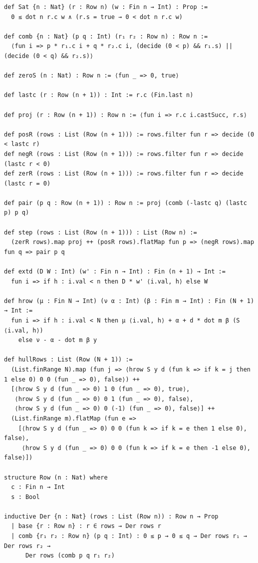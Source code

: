 \label{lean:constr-farkas}
\begin{lstlisting}
def Sat {n : Nat} (r : Row n) (w : Fin n → Int) : Prop :=
  0 ≤ dot n r.c w ∧ (r.s = true → 0 < dot n r.c w)

def comb {n : Nat} (p q : Int) (r₁ r₂ : Row n) : Row n :=
  ⟨fun i => p * r₁.c i + q * r₂.c i, (decide (0 < p) && r₁.s) || (decide (0 < q) && r₂.s)⟩

def zeroS (n : Nat) : Row n := ⟨fun _ => 0, true⟩

def lastc (r : Row (n + 1)) : Int := r.c (Fin.last n)

def proj (r : Row (n + 1)) : Row n := ⟨fun i => r.c i.castSucc, r.s⟩

def posR (rows : List (Row (n + 1))) := rows.filter fun r => decide (0 < lastc r)
def negR (rows : List (Row (n + 1))) := rows.filter fun r => decide (lastc r < 0)
def zerR (rows : List (Row (n + 1))) := rows.filter fun r => decide (lastc r = 0)

def pair (p q : Row (n + 1)) : Row n := proj (comb (-lastc q) (lastc p) p q)

def step (rows : List (Row (n + 1))) : List (Row n) :=
  (zerR rows).map proj ++ (posR rows).flatMap fun p => (negR rows).map fun q => pair p q

def extd (D W : Int) (w' : Fin n → Int) : Fin (n + 1) → Int :=
  fun i => if h : i.val < n then D * w' ⟨i.val, h⟩ else W

def hrow (μ : Fin N → Int) (ν α : Int) (β : Fin m → Int) : Fin (N + 1) → Int :=
  fun i => if h : i.val < N then μ ⟨i.val, h⟩ + α + d * dot m β (S ⟨i.val, h⟩)
    else ν - α - dot m β y

def hullRows : List (Row (N + 1)) :=
  (List.finRange N).map (fun j => ⟨hrow S y d (fun k => if k = j then 1 else 0) 0 0 (fun _ => 0), false⟩) ++
  [⟨hrow S y d (fun _ => 0) 1 0 (fun _ => 0), true⟩,
   ⟨hrow S y d (fun _ => 0) 0 1 (fun _ => 0), false⟩,
   ⟨hrow S y d (fun _ => 0) 0 (-1) (fun _ => 0), false⟩] ++
  (List.finRange m).flatMap (fun e =>
    [⟨hrow S y d (fun _ => 0) 0 0 (fun k => if k = e then 1 else 0), false⟩,
     ⟨hrow S y d (fun _ => 0) 0 0 (fun k => if k = e then -1 else 0), false⟩])

structure Row (n : Nat) where
  c : Fin n → Int
  s : Bool

inductive Der {n : Nat} (rows : List (Row n)) : Row n → Prop
  | base {r : Row n} : r ∈ rows → Der rows r
  | comb {r₁ r₂ : Row n} (p q : Int) : 0 ≤ p → 0 ≤ q → Der rows r₁ → Der rows r₂ →
      Der rows (comb p q r₁ r₂)


\end{lstlisting}
